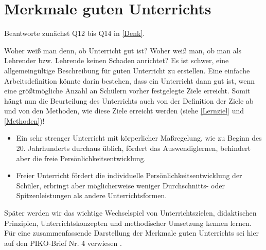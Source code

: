 \chapter{Merkmale guten Unterrichts}\label{GuterUnterricht}

\begin{uea}
	Beantworte zunächst Q12 bis Q14 in \cref{Denk}.
\end{uea}

Woher weiß man denn, ob Unterricht gut ist? Woher weiß man, ob man als Lehrender bzw. Lehrende keinen Schaden 
anrichtet? Es ist schwer,  eine allgemeing{\"u}ltige Beschreibung f{\"u}r guten Unterricht zu erstellen. Eine einfache Arbeitsdefinition k{\"o}nnte darin
bestehen, dass ein Unterricht dann gut ist, wenn eine gr{\"o}{\ss}tm{\"o}gliche Anzahl an Sch{\"u}lern vorher
festgelegte Ziele erreicht. Somit h{\"a}ngt nun die Beurteilung des Unterrichts auch von der Definition der Ziele ab und von den Methoden, wie diese Ziele erreicht werden (siehe \cref{Lernziel} und \ref{Methoden})!

\begin{beisp2}
\begin{itemize}
\item
Ein sehr strenger Unterricht mit k{\"o}rperlicher Ma{\ss}regelung, wie zu Beginn des 20. Jahrhunderts durchaus {\"u}blich,
f{\"o}rdert das Auswendiglernen, behindert aber die freie Pers{\"o}nlichkeitsentwicklung.
\item
Freier Unterricht f{\"o}rdert die individuelle Pers{\"o}nlichkeitsentwicklung der Sch{\"u}ler, erbringt aber 
m{\"o}glicherweise weniger Durchschnitts- oder Spitzenleistungen als andere Unterrichtsformen.
\end{itemize}
\end{beisp2}

Sp{\"a}ter werden wir das wichtige Wechselspiel von Unterrichtszielen, didaktischen Prinzipien, Unterrichtskonzepten und 
methodischer Umsetzung kennen lernen. F{\"u}r eine zusammenfassende Darstellung der Merkmale guten Unterrichts sei
hier auf den PIKO-Brief Nr. 4 verwiesen \autocite{piko4}.

\bip\bip
